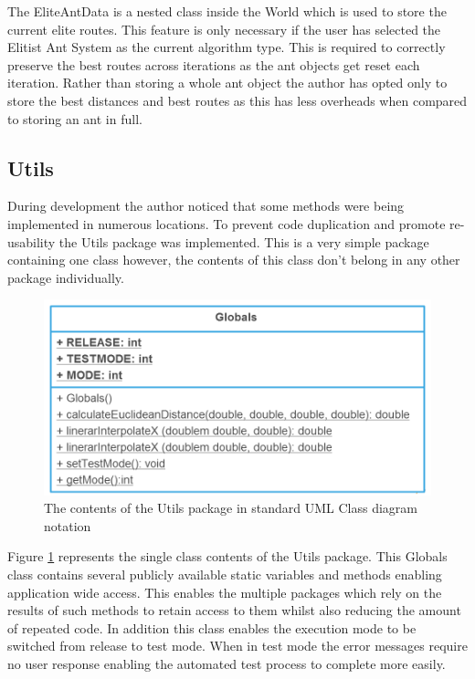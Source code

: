 The EliteAntData is a nested class inside the World which is used to store the current elite routes. This feature is only necessary if the user has selected the Elitist Ant System as the current algorithm type. This is required to correctly preserve the best routes across iterations as the ant objects get reset each iteration. Rather than storing a whole ant object the author has opted only to store the best distances and best routes as this has less overheads when compared to storing an ant in full.

\subsection{Utils}

During development the author noticed that some methods were being implemented in numerous locations. To prevent code duplication and promote re-usability the Utils package was implemented. This is a very simple package containing one class however, the contents of this class don't belong in any other package individually.

\begin{figure}[H]
\centering
\includegraphics[scale=0.3]{Images/chapter4/gloabls}
\caption[Utils Package Class Diagram]{The contents of the Utils package in standard UML Class diagram notation}
\label{fig:utilsImp}
\end{figure}

Figure \ref{fig:utilsImp} represents the single class contents of the Utils package. This Globals class contains several publicly available static variables and methods enabling application wide access. This enables the multiple packages which rely on the results of such methods to retain access to them whilst also reducing the amount of repeated code. In addition this class enables the execution mode to be switched from release to test mode. When in test mode the error messages require no user response enabling the automated test process to complete more easily.

